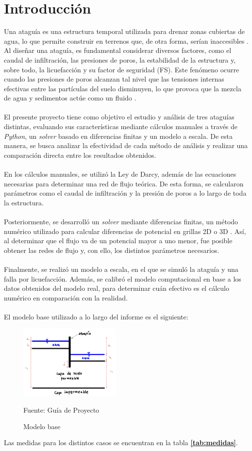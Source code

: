 \part{Introducción}

Una ataguía es una estructura temporal utilizada para drenar zonas cubiertas de agua, 
lo que permite construir en terrenos que, de otra forma, serían inaccesibles 
\cite{madanayaka2018}. Al diseñar una ataguía, es fundamental considerar diversos 
factores, como el caudal de infiltración, las presiones de poros, la estabilidad 
de la estructura y, sobre todo, la licuefacción y su factor de seguridad (FS).
 Este fenómeno ocurre cuando las presiones de poros alcanzan tal nivel que las 
 tensiones internas efectivas entre las partículas del suelo disminuyen, lo que provoca 
 que la mezcla de agua y sedimentos actúe como un fluido \citep{sumer2009}.
\\ \\
El presente proyecto tiene como objetivo el estudio y análisis de tres ataguías 
distintas, evaluando sus características mediante cálculos manuales a través de \textit{Python}, 
un \textit{solver} basado en diferencias finitas y un modelo a escala. De esta manera, se busca 
analizar la efectividad de cada método de análisis y realizar una comparación directa entre
 los resultados obtenidos.
\\ \\
En los cálculos manuales, se utilizó la Ley de Darcy, además de las ecuaciones necesarias
 para determinar una red de flujo teórica. De esta forma, se calcularon parámetros como el
  caudal de infiltración y la presión de poros a lo largo de toda la estructura.
\\ \\
Posteriormente, se desarrolló un \textit{solver} mediante diferencias finitas, un método numérico 
utilizado para calcular diferencias de potencial en grillas 2D o 3D \citep{zhang2005}. 
Así, al determinar que el flujo va de un potencial mayor a uno menor, fue posible obtener 
las redes de flujo y, con ello, los distintos parámetros necesarios.
\\ \\
Finalmente, se realizó un modelo a escala, en el que se simuló la ataguía y una falla
 por licuefacción. Además, se calibró el modelo computacional en base a los 
 datos obtenidos del modelo real, para determinar cuán efectivo es el cálculo numérico 
 en comparación con la realidad.
\\ \\
El modelo base utilizado a lo largo del informe es el siguiente:

\begin{figure}[H]
    \centering
    \includegraphics[width=0.45\textwidth]{FOTOS/modelo_base.png}
    \caption{Modelo base}
    Fuente: Guía de Proyecto
    \label{fig:modelo_base}
\end{figure}

Las medidas para los distintos casos se encuentran en la tabla \textbf{\ref{tab:medidas}}.
